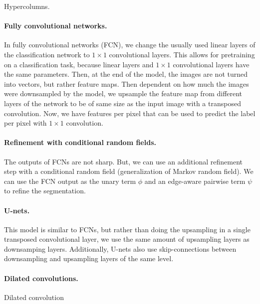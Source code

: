 \begin{marginfigure}
    \centering
    \caption{Hypercolumns.}
    \label{fig:hypercolumns}
\end{marginfigure}

\paragraph{Fully convolutional networks.}

In fully convolutional networks (FCN), we change the usually used linear layers
of the classification network to $1\times 1$ convolutional layers. This allows
for pretraining on a classification task, because linear layers and $1\times 1$
convolutional layers have the same parameters. Then, at the end of the model,
the images are not turned into vectors, but rather feature maps. Then dependent
on how much the images were downsampled by the model, we upsample the feature
map from different layers of the network to be of same size as the input image
with a transposed convolution. Now, we have features per pixel that can be used
to predict the label per pixel with $1\times 1$ convolution.

\paragraph{Refinement with conditional random fields.}

The outputs of FCNs are not sharp. But, we can use an additional refinement
step with a conditional random field (generalization of Markov random field).
We can use the FCN output as the unary term $\phi$ and an edge-aware pairwise
term $\psi$ to refine the segmentation.

\paragraph{U-nets.}

This model is similar to FCNs, but rather than doing the upsampling in a single
transposed convolutional layer, we use the same amount of upsampling layers as
downsamping layers. Additionally, U-nets also use skip-connections between
downsampling and upsampling layers of the same level.

\paragraph{Dilated convolutions.}

\begin{marginfigure}
    \centering
    \caption{Dilated convolution}
    \label{fig:dilated-convolution}
\end{marginfigure}

